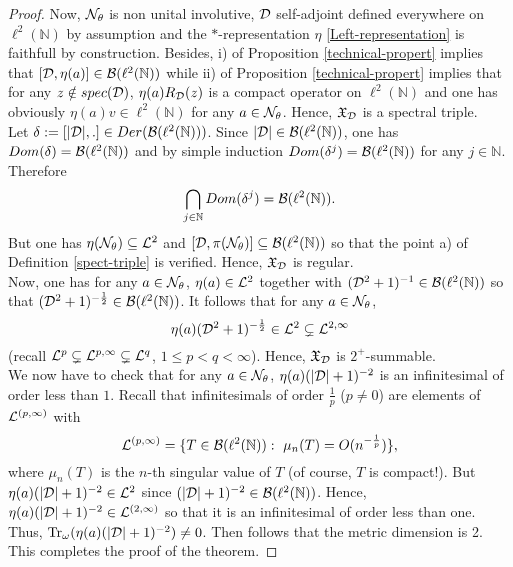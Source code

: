 \documentclass[a4paper,11pt,twoside]{article}
\numberwithin{equation}{section}
\DeclareMathOperator{\tr}{Tr}
\theoremstyle{nonumberplain}
\newtheorem{proof}{Proof}
\newcounter{and}
\begin{document}
\begin{proof}
\noindent Now, ${\cal{N}}_\theta$ is non unital involutive, ${\cal{D}}$ self-adjoint defined everywhere on $\ell^2(\mathbb{N})$ by assumption and the $*$-representation $\eta$ \eqref{Left-representation} is faithfull by construction. Besides, i) of Proposition \ref{technical-propert} implies that $[{\cal{D}},\eta(a)]\in{\cal{B}}(\ell^2(\mathbb{N}))$ while ii) of Proposition \ref{technical-propert} implies that for any $z\notin spec({\cal{D}})$, $\eta(a)R_{\cal{D}}(z)$ is a compact operator on $\ell^2(\mathbb{N})$ and one has obviously $\eta(a)v\in\ell^2(\mathbb{N})$ for any $a\in{\cal{N}}_\theta$. Hence, $\mathfrak{X}_{{\cal{D}}}$ is a spectral triple.\\
Let $\delta:=[|{\cal{D}}|,.]\in Der({\cal{B}}(\ell^2(\mathbb{N}))) $. Since $|{\cal{D}}|\in{\cal{B}}(\ell^2(\mathbb{N}))$, one has $Dom(\delta)={\cal{B}}(\ell^2(\mathbb{N}))$ and by simple induction $Dom(\delta^j)={\cal{B}}(\ell^2(\mathbb{N}))$ for any $j\in\mathbb{N}$. Therefore
\begin{equation}
\bigcap_{j\in\mathbb{N}}Dom(\delta^j)={\cal{B}}(\ell^2(\mathbb{N}))\label{rhs-regular}.
\end{equation}
But one has $\eta({\cal{N}}_\theta)\subseteq{\cal{L}}^2$ and $[{\cal{D}},\pi({\cal{N}}_\theta)]\subseteq{\cal{B}}(\ell^2(\mathbb{N}))$ so that the point a) of Definition \ref{spect-triple} is verified. Hence, $\mathfrak{X}_{{\cal{D}}}$ is regular.\\
Now, one has for any $a\in{\cal{N}}_\theta$, $\eta(a)\in{\cal{L}}^2$ together with $({\cal{D}}^2+1)^{-1}\in{\cal{B}}(\ell^2(\mathbb{N}))$ so that $({\cal{D}}^2+1)^{-\frac{1}{2}}\in{\cal{B}}(\ell^2(\mathbb{N}))$. It follows that for any $a\in{\cal{N}}_\theta$,
\begin{equation}
\eta(a)({\cal{D}}^2+1)^{-\frac{1}{2}}\in{\cal{L}}^2\subsetneq{\cal{L}}^{2,\infty}
\end{equation}
(recall ${\cal{L}}^p\subsetneq{\cal{L}}^{p,\infty}\subsetneq{\cal{L}}^q$, $1\le 
p<q<\infty$). Hence, $\mathfrak{X}_{{\cal{D}}}$ is $2^+$-summable.\\
We now have to check that for any $a\in{\cal{N}}_\theta$, $\eta(a)(|{\cal{D}}|+1)^{-2}$ is an infinitesimal of order less than $1$. Recall that infinitesimals of order $\frac{1}{p}$ ($p\ne0$) are elements of ${\cal{L}}^{(p,\infty)}$ with
\begin{equation}
{\cal{L}}^{(p,\infty)}=\{T\in{\cal{B}}(\ell^2(\mathbb{N})):\ \mu_n(T)=O(n^{-\frac{1}{p}}) \},\label{ideal-infinitesim}
\end{equation}
where $\mu_n(T)$ is the $n$-th singular value of $T$ (of course, $T$ is compact!). But $\eta(a)(|{\cal{D}}|+1)^{-2}\in{\cal{L}}^2$ since $(|{\cal{D}}|+1)^{-2}\in{\cal{B}}(\ell^2(\mathbb{N}))$. Hence, $\eta(a)(|{\cal{D}}|+1)^{-2}\in{\cal{L}}^{(2,\infty)}$ so that it is an infinitesimal of order less than one. Thus, $\tr_\omega(\eta(a)(|{\cal{D}}|+1)^{-2})\ne0$. Then follows that the metric dimension is 2. This completes the proof of the theorem.
\end{proof}
\end{document}
